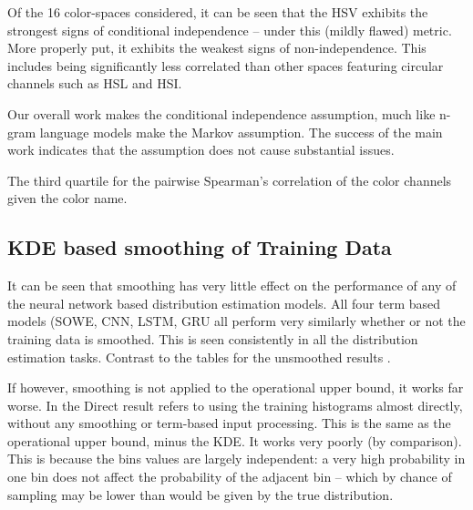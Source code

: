 \documentclass[11pt,a4paper]{article}
\begin{document}
Of the 16 color-spaces considered, it can be seen that the HSV exhibits the strongest signs of conditional independence -- under this (mildly flawed) metric.
More properly put, it exhibits the weakest signs of non-independence.
This includes being significantly less correlated than other spaces featuring circular channels such as HSL and HSI.

Our overall work makes the conditional independence assumption, much like n-gram language models make the Markov assumption.
The success of the main work indicates that the assumption does not cause substantial issues.



\begin{table}
	\caption{\label{tbl:colorcor} The third quartile for the pairwise Spearman's correlation of the color channels given the color name.}
	\centering
\end{table}

\subsection{KDE based smoothing of Training Data}\label{sec:smoothed-results}

It can be seen that smoothing has very little effect on the performance of any of the neural network based distribution estimation models.
All four term based models (SOWE, CNN, LSTM, GRU all perform very similarly whether or not the training data is smoothed.
This is seen consistently in all the distribution estimation tasks.
Contrast 
to the tables for the unsmoothed results
.

If however, smoothing is not applied to the operational upper bound, it works far worse.
In   the Direct result refers to using the training histograms almost directly, without any smoothing or term-based input processing.
This is the same as the operational upper bound, minus the KDE.
It works very poorly (by comparison).
This is because the bins values are largely independent: a very high probability in one bin does not affect the probability of the adjacent bin -- which by chance of sampling may be lower than would be given by the true distribution.
\end{document}
